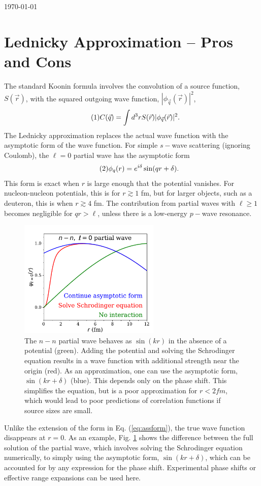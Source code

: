 \documentclass[12pt]{article}
\numberwithin{equation}{section}
\numberwithin{figure}{section}
\newcommand\eqnumber{\addtocounter{equation}{1}\tag{\theequation}}
\begin{document}
\today\\

\section{Lednicky Approximation -- Pros and Cons}

The standard Koonin formula involves the convolution of a source function, $S(\vec{r})$, with the squared outgoing wave function, $|\phi_{\vec{q}}(\vec{r})|^2$,
\begin{align*}\eqnumber\label{eq:koonin}
C(\vec{q})&=\int d^3r S(\vec{r})|\phi_{\vec{q}}(\vec{r})|^2.
\end{align*}
The Lednicky approximation replaces the actual wave function with the asymptotic form of the wave function. For simple $s-$wave scattering (ignoring Coulomb), the $\ell=0$ partial wave  has the asymptotic form
\begin{align*}\eqnumber\label{eq:assform}
\phi_q(r)=e^{i\delta}\sin(qr+\delta).
\end{align*}
This form is exact when $r$ is large enough that the potential vanishes. For nucleon-nucleon potentials, this is for $r\gtrsim 1$ fm, but for larger objects, such as a deuteron, this is when $r\gtrsim 4$ fm. The contribution from partial waves with $\ell\ge 1$ becomes negligible for $qr >\ell$, unless there is a low-energy $p-$wave resonance. 

\begin{figure}
\centerline{\includegraphics[width=0.6\textwidth]{nnwf}}
\caption{\label{fig:nnwf}
The $n-n$ partial wave behaves as $\sin(kr)$ in the absence of a potential (green). Adding the potential and solving the Schrodinger equation results in a wave function with additional strength near the origin (red). As an approximation, one can use the asymptotic form, $\sin(kr+\delta)$ (blue). This depends only on the phase shift. This simplifies the equation, but is a poor approximation for $r<2 fm$, which would lead to poor predictions of correlation functions if source sizes are small.}
\end{figure}
Unlike the extension of the form in Eq. (\ref{eq:assform}), the true wave function disappears at $r=0$. As an example, Fig. \ref{fig:nnwf} shows the difference between the full solution of the partial wave, which involves solving the Schrodinger equation numerically, to simply using the asymptotic form, $\sin(kr+\delta)$, which can be accounted for by any expression for the phase shift. Experimental phase shifts or effective range expansions can be used here.
\end{document}

